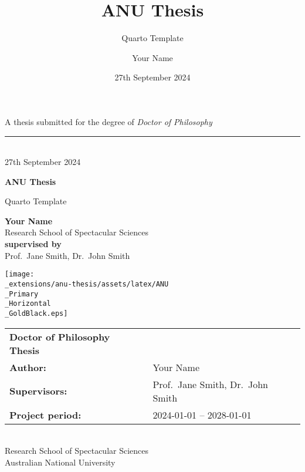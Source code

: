 \documentclass[
  a4paper,
  oneside,
  openany,
  12pt,
  onecolumn]{book}
\title{ANU Thesis}
\subtitle{Quarto Template}
\author{Your Name}
\date{27th September 2024}
\theoremstyle{plain}
\theoremstyle{definition}
\theoremstyle{remark}
\begin{document}
  \begin{frontmatter}
  \begin{titlepage}

  \begin{titlepage}
    \begin{flushright}%
      \vspace{50mm}
      {\small A thesis submitted for the degree of {\it Doctor of
  Philosophy}}
      \rule[1ex]{\textwidth}{1pt}\\
      {\fontsize{9}{0} 27th September 2024}\\
      \vspace{25mm}
      {\fontsize{40}{44}\bfseries ANU Thesis\par}
        \vspace{12mm}
    	\parbox{\textwidth}{
  	\begin{flushright}
  		\fontsize{28}{30} Quarto Template
  	\end{flushright}}
  	    \vfill
      {\fontsize{20}{0}\bfseries Your Name}\\
      \vspace{2mm}
      {\fontsize{8}{0} Research School of Spectacular Sciences}\\
      \vspace{35mm}
      {\fontsize{10}{0}\bfseries supervised by}\\
      Prof.~Jane Smith, Dr.~John Smith
      
      \vspace{2.0cm}
  		\texttt{[image: \\\_extensions/anu-thesis/assets/latex/ANU\\\_Primary\\\_Horizontal\\\_GoldBlack.eps]}\\
   \end{flushright}%

   \clearpage\thispagestyle{empty}
   \normalfont
   \vspace*{\fill}
   \noindent
   \begin{tabular}{lp{10cm}}
     {\bf Doctor of Philosophy Thesis} & \\[2mm]
     {\bf Author:} & Your Name\\[2mm]
     {\bf Supervisors:} & Prof.~Jane Smith, Dr.~John Smith\\[2mm]
     
     {\bf Project period:} & 2024-01-01 -- 2028-01-01 \\[2mm]
   \end{tabular}\\[2mm]

  \noindent Research School of Spectacular Sciences\\
  \noindent Australian National University

  \end{titlepage}
  \setlength{\parindent}{0pt}
  \setlength{\parskip}{1ex plus 0.5ex minus 0.2ex}








  \end{titlepage}
  \end{frontmatter}
\end{document}
